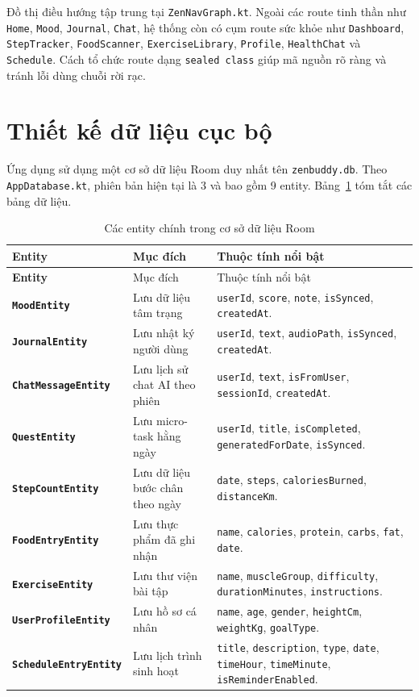 \documentclass{zenbuddy-report}
\begin{document}
Đồ thị điều hướng tập trung tại \texttt{ZenNavGraph.kt}. Ngoài các route tinh thần như \texttt{Home}, \texttt{Mood}, \texttt{Journal}, \texttt{Chat}, hệ thống còn có cụm route sức khỏe như \texttt{Dashboard}, \texttt{StepTracker}, \texttt{FoodScanner}, \texttt{ExerciseLibrary}, \texttt{Profile}, \texttt{HealthChat} và \texttt{Schedule}. Cách tổ chức route dạng \texttt{sealed class} giúp mã nguồn rõ ràng và tránh lỗi dùng chuỗi rời rạc.

\section{Thiết kế dữ liệu cục bộ}
Ứng dụng sử dụng một cơ sở dữ liệu Room duy nhất tên \texttt{zenbuddy.db}. Theo \texttt{AppDatabase.kt}, phiên bản hiện tại là 3 và bao gồm 9 entity. Bảng~\ref{tab:entities} tóm tắt các bảng dữ liệu.

\begin{longtable}{>{\bfseries}p{3.1cm}p{4.2cm}X}
\caption{Các entity chính trong cơ sở dữ liệu Room}\label{tab:entities}\\
\toprule
Entity & Mục đích & Thuộc tính nổi bật \\
\midrule
\endfirsthead
\toprule
Entity & Mục đích & Thuộc tính nổi bật \\
\midrule
\endhead
\texttt{MoodEntity} & Lưu dữ liệu tâm trạng & \texttt{userId}, \texttt{score}, \texttt{note}, \texttt{isSynced}, \texttt{createdAt}. \\
\texttt{JournalEntity} & Lưu nhật ký người dùng & \texttt{userId}, \texttt{text}, \texttt{audioPath}, \texttt{isSynced}, \texttt{createdAt}. \\
\texttt{ChatMessageEntity} & Lưu lịch sử chat AI theo phiên & \texttt{userId}, \texttt{text}, \texttt{isFromUser}, \texttt{sessionId}, \texttt{createdAt}. \\
\texttt{QuestEntity} & Lưu micro-task hằng ngày & \texttt{userId}, \texttt{title}, \texttt{isCompleted}, \texttt{generatedForDate}, \texttt{isSynced}. \\
\texttt{StepCountEntity} & Lưu dữ liệu bước chân theo ngày & \texttt{date}, \texttt{steps}, \texttt{caloriesBurned}, \texttt{distanceKm}. \\
\texttt{FoodEntryEntity} & Lưu thực phẩm đã ghi nhận & \texttt{name}, \texttt{calories}, \texttt{protein}, \texttt{carbs}, \texttt{fat}, \texttt{date}. \\
\texttt{ExerciseEntity} & Lưu thư viện bài tập & \texttt{name}, \texttt{muscleGroup}, \texttt{difficulty}, \texttt{durationMinutes}, \texttt{instructions}. \\
\texttt{UserProfileEntity} & Lưu hồ sơ cá nhân & \texttt{name}, \texttt{age}, \texttt{gender}, \texttt{heightCm}, \texttt{weightKg}, \texttt{goalType}. \\
\texttt{ScheduleEntryEntity} & Lưu lịch trình sinh hoạt & \texttt{title}, \texttt{description}, \texttt{type}, \texttt{date}, \texttt{timeHour}, \texttt{timeMinute}, \texttt{isReminderEnabled}. \\
\bottomrule
\end{longtable}
\end{document}
